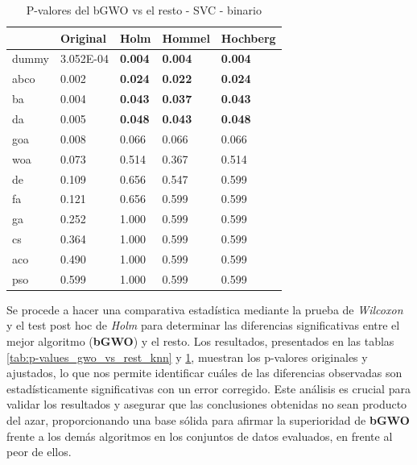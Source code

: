 \begin{table}[htp]
    \centering
    \begin{tabular}{lllll}
        \toprule
        {}    & Original  & Holm  & Hommel & Hochberg \\
        \midrule
        dummy & 3.052E-04 & \textbf{0.004} & \textbf{0.004}  & \textbf{0.004}    \\
        abco  & 0.002     & \textbf{0.024} & \textbf{0.022}  & \textbf{0.024}    \\
        ba    & 0.004     & \textbf{0.043} & \textbf{0.037}  & \textbf{0.043}    \\
        da    & 0.005     & \textbf{0.048} & \textbf{0.043}  & \textbf{0.048}    \\
        goa   & 0.008     & 0.066 & 0.066  & 0.066    \\
        woa   & 0.073     & 0.514 & 0.367  & 0.514    \\
        de    & 0.109     & 0.656 & 0.547  & 0.599    \\
        fa    & 0.121     & 0.656 & 0.599  & 0.599    \\
        ga    & 0.252     & 1.000 & 0.599  & 0.599    \\
        cs    & 0.364     & 1.000 & 0.599  & 0.599    \\
        aco   & 0.490     & 1.000 & 0.599  & 0.599    \\
        pso   & 0.599     & 1.000 & 0.599  & 0.599    \\
        \bottomrule
    \end{tabular}
    \caption{P-valores del bGWO vs el resto - SVC - binario}
    \label{tab:p-values_gwo_vs_rest_svc}
\end{table}

Se procede a hacer una comparativa estadística mediante la prueba de \textit{Wilcoxon} y el test post hoc de \textit{Holm} para determinar las diferencias significativas entre el mejor algoritmo (\textbf{bGWO}) y el resto. Los resultados, presentados en las tablas \ref{tab:p-values_gwo_vs_rest_knn} y \ref{tab:p-values_gwo_vs_rest_svc}, muestran los p-valores originales y ajustados, lo que nos permite identificar cuáles de las diferencias observadas son estadísticamente significativas con un error corregido. Este análisis es crucial para validar los resultados y asegurar que las conclusiones obtenidas no sean producto del azar, proporcionando una base sólida para afirmar la superioridad de \textbf{bGWO} frente a los demás algoritmos en los conjuntos de datos evaluados, en frente al peor de ellos.\\[6pt]

